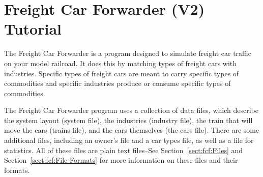 
\chapter{Freight Car Forwarder (V2) Tutorial}
\label{chpt:fcf:Tutorial}


 The Freight Car Forwarder is a
program designed to simulate freight car traffic on your model
railroad.  It does this by matching types of freight cars with
industries.  Specific types of freight cars are meant to carry specific
types of commodities and specific industries produce or consume
specific types of commodities.

The Freight Car Forwarder program uses a collection of data files,
which describe the system layout (system file), the industries
(industry file), the train that will move the cars (trains file), and
the cars themselves (the cars file).  There are some additional files,
including an owner's file and a car types file, as well as a file for
statistics.  All of these files are plain text files--See
Section~\ref{sect:fcf:Files} and  Section~\ref{sect:fcf:File Formats}
for more information on these files and their formats.

